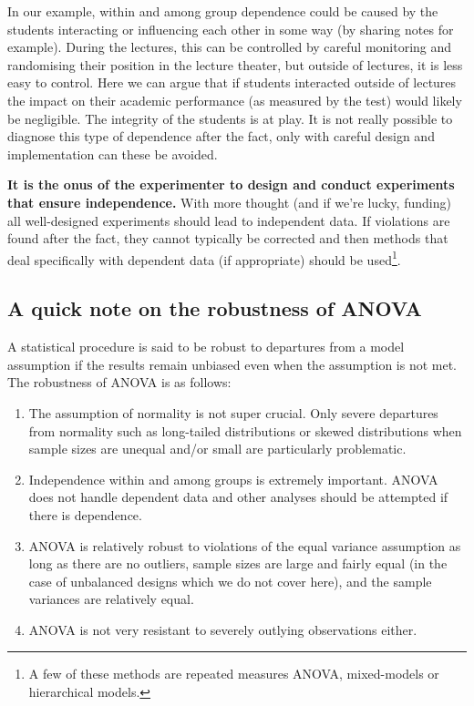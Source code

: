 \documentclass[
  letterpaper,
]{book}
\begin{document}
In our example, within and among group dependence could be caused by the
students interacting or influencing each other in some way (by sharing
notes for example). During the lectures, this can be controlled by
careful monitoring and randomising their position in the lecture
theater, but outside of lectures, it is less easy to control. Here we
can argue that if students interacted outside of lectures the impact on
their academic performance (as measured by the test) would likely be
negligible. The integrity of the students is at play. It is not really
possible to diagnose this type of dependence after the fact, only with
careful design and implementation can these be avoided.

\textbf{It is the onus of the experimenter to design and conduct
experiments that ensure independence.} With more thought (and if we're
lucky, funding) all well-designed experiments should lead to independent
data. If violations are found after the fact, they cannot typically be
corrected and then methods that deal specifically with dependent data
(if appropriate) should be used\footnote{A few of these methods are
  repeated measures ANOVA, mixed-models or hierarchical models.}.

\subsection*{A quick note on the robustness of
ANOVA}\label{a-quick-note-on-the-robustness-of-anova}

A statistical procedure is said to be robust to departures from a model
assumption if the results remain unbiased even when the assumption is
not met. The robustness of ANOVA is as follows:

\begin{enumerate}
\def\labelenumi{\arabic{enumi}.}
\item
  The assumption of normality is not super crucial. Only severe
  departures from normality such as long-tailed distributions or skewed
  distributions when sample sizes are unequal and/or small are
  particularly problematic.
\item
  Independence within and among groups is extremely important. ANOVA
  does not handle dependent data and other analyses should be attempted
  if there is dependence.
\item
  ANOVA is relatively robust to violations of the equal variance
  assumption as long as there are no outliers, sample sizes are large
  and fairly equal (in the case of unbalanced designs which we do not
  cover here), and the sample variances are relatively equal.
\item
  ANOVA is not very resistant to severely outlying observations either.
\end{enumerate}
\end{document}
